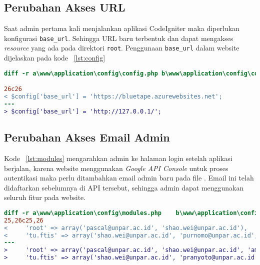 \subsection{Perubahan Akses URL}
Saat admin pertama kali menjalankan aplikasi CodeIgniter maka diperlukan konfigurasi \texttt{base\_url}. Sehingga URL baru terbentuk dan dapat mengakses \textit{resource} yang ada pada direktori \texttt{root}. Penggunaan \texttt{base\_url} dalam website dijelaskan pada kode ~\ref{lst:config}\\

\begin{lstlisting}[language=diff, caption=Perubahan file /config/config.php,  basicstyle=\ttfamily, frame=single,
columns=fullflexible, keepspaces=true, breaklines=true, label={lst:config}]
diff -r a\www\application\config\config.php b\www\application\config\config.php

26c26
< $config['base_url'] = 'https://bluetape.azurewebsites.net';
---
> $config['base_url'] = 'http://127.0.0.1/';
\end{lstlisting}

\subsection{Perubahan Akses Email Admin}

Kode ~\ref{lst:modules} mengarahkan admin ke halaman login setelah aplikasi berjalan, karena website menggunakan \textit{Google API Console} untuk proses autentikasi maka perlu ditambahkan email admin baru pada file . Email ini telah didaftarkan sebelumnya di API tersebut, sehingga admin dapat menggunakan seluruh fitur pada website. \\

\begin{lstlisting}[language=diff, caption=Perubahan file /config/modules.php,  basicstyle=\ttfamily, frame=single,
columns=fullflexible, keepspaces=true, breaklines=true, label={lst:modules}]
diff -r a\www\application\config\modules.php 	b\www\application\config\modules.php
25,26c25,26
<     'root' => array('pascal@unpar.ac.id', 'shao.wei@unpar.ac.id'),
<     'tu.ftis' => array('shao.wei@unpar.ac.id', 'purnomo@unpar.ac.id', 'walip@unpar.ac.id'),
---
>     'root' => array('pascal@unpar.ac.id', 'shao.wei@unpar.ac.id', 'amihapsahapsa@gmail.com'),
>     'tu.ftis' => array('shao.wei@unpar.ac.id', 'pranyoto@unpar.ac.id', 'walip@unpar.ac.id'),

\end{lstlisting}

